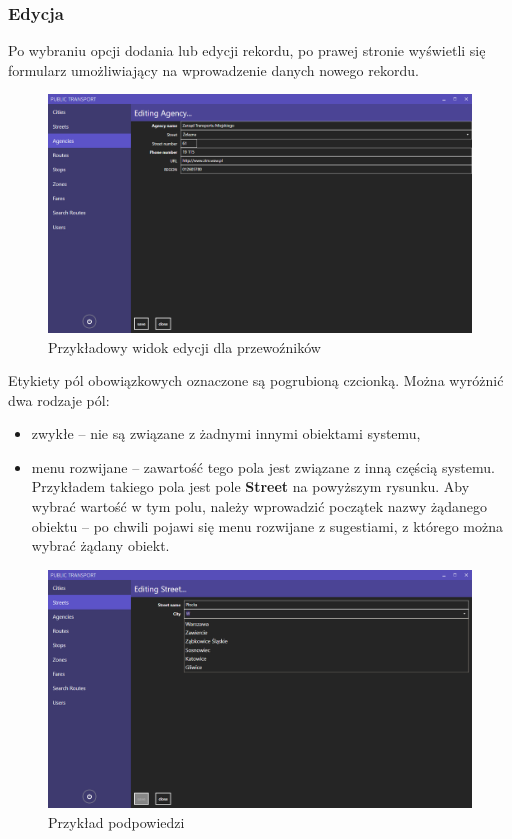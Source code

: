 \documentclass[10pt,a4paper]{article}
\begin{document}
\subsubsection{Edycja}
Po wybraniu opcji dodania lub edycji rekordu, po prawej stronie wyświetli się formularz umożliwiający na wprowadzenie danych nowego rekordu.
\begin{figure}[H]
	\centering
	\includegraphics[width=15cm]{screenshots/08_edit_agency.png}
	\caption{Przykładowy widok edycji dla przewoźników}
\end{figure}
Etykiety pól obowiązkowych oznaczone są pogrubioną czcionką. Można wyróżnić dwa rodzaje pól:
\begin{itemize}
	\item zwykłe -- nie są związane z żadnymi innymi obiektami systemu,
	\item menu rozwijane -- zawartość tego pola jest związane z inną częścią systemu. Przykładem takiego pola jest pole \textbf{Street} na powyższym rysunku. Aby wybrać wartość w tym polu, należy wprowadzić początek nazwy żądanego obiektu -- po chwili pojawi się menu rozwijane z sugestiami, z którego można wybrać żądany obiekt.
\end{itemize}
\begin{figure}[H]
	\centering
	\includegraphics[width=15cm]{screenshots/06_edit_street.png}
	\caption{Przykład podpowiedzi}
\end{figure}
\end{document}
